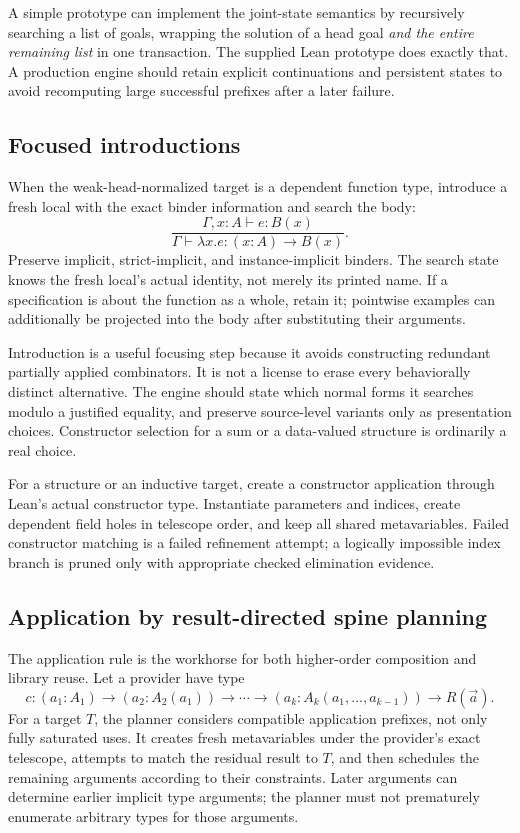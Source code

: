 \documentclass[11pt,letterpaper]{article}
\newcommand{\Ctx}{\Gamma}
\theoremstyle{definition}
\theoremstyle{remark}
\begin{document}
A simple prototype can implement the joint-state semantics by recursively searching a list of goals, wrapping the solution of a head goal \emph{and the entire remaining list} in one transaction. The supplied Lean prototype does exactly that. A production engine should retain explicit continuations and persistent states to avoid recomputing large successful prefixes after a later failure.

\subsection{Focused introductions}

When the weak-head-normalized target is a dependent function type, introduce a fresh local with the exact binder information and search the body:
\[
 \frac{\Ctx,x:A\vdash e:B(x)}{\Ctx\vdash \lambda x.e:(x:A)\to B(x)}.
\]
Preserve implicit, strict-implicit, and instance-implicit binders. The search state knows the fresh local's actual identity, not merely its printed name. If a specification is about the function as a whole, retain it; pointwise examples can additionally be projected into the body after substituting their arguments.

Introduction is a useful focusing step because it avoids constructing redundant partially applied combinators. It is not a license to erase every behaviorally distinct alternative. The engine should state which normal forms it searches modulo a justified equality, and preserve source-level variants only as presentation choices. Constructor selection for a sum or a data-valued structure is ordinarily a real choice.

For a structure or an inductive target, create a constructor application through Lean's actual constructor type. Instantiate parameters and indices, create dependent field holes in telescope order, and keep all shared metavariables. Failed constructor matching is a failed refinement attempt; a logically impossible index branch is pruned only with appropriate checked elimination evidence.

\subsection{Application by result-directed spine planning}

The application rule is the workhorse for both higher-order composition and library reuse. Let a provider have type
\[
 c:(a_1:A_1)\to(a_2:A_2(a_1))\to\cdots\to
       (a_k:A_k(a_1,\ldots,a_{k-1}))\to R(\vec a).
\]
For a target $T$, the planner considers compatible application prefixes, not only fully saturated uses. It creates fresh metavariables under the provider's exact telescope, attempts to match the residual result to $T$, and then schedules the remaining arguments according to their constraints. Later arguments can determine earlier implicit type arguments; the planner must not prematurely enumerate arbitrary types for those arguments.
\end{document}
